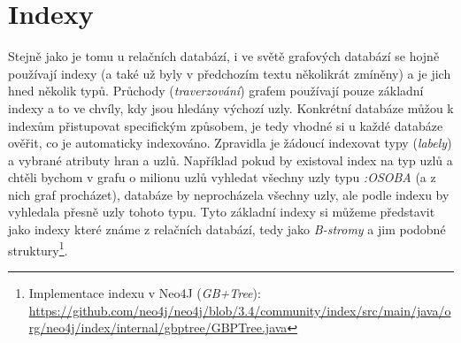 \section{Indexy}
\label{sec:gdb-indexy}
Stejně jako je tomu u relačních databází, i ve světě grafových databází se hojně používají indexy (a také už byly v předchozím textu několikrát zmíněny) a je jich hned několik typů. Průchody (\textit{traverzování}) grafem používají pouze základní indexy a to ve chvíly, kdy jsou hledány výchozí uzly. Konkrétní databáze můžou k indexům přistupovat specifickým způsobem, je tedy vhodné si u každé databáze ověřit, co je automaticky indexováno. Zpravidla je žádoucí indexovat typy (\textit{labely}) a vybrané atributy hran a uzlů. Například pokud by existoval index na typ uzlů a chtěli bychom v grafu o milionu uzlů vyhledat všechny uzly typu \textit{:OSOBA} (a z nich graf procházet), databáze by neprocházela všechny uzly, ale podle indexu by vyhledala přesně uzly tohoto typu. Tyto základní indexy si můžeme představit jako indexy které známe z relačních databází, tedy jako \textit{B-stromy} a jim podobné struktury\footnote{Implementace indexu v Neo4J (\textit{GB+Tree}): \url{https://github.com/neo4j/neo4j/blob/3.4/community/index/src/main/java/org/neo4j/index/internal/gbptree/GBPTree.java}}.

